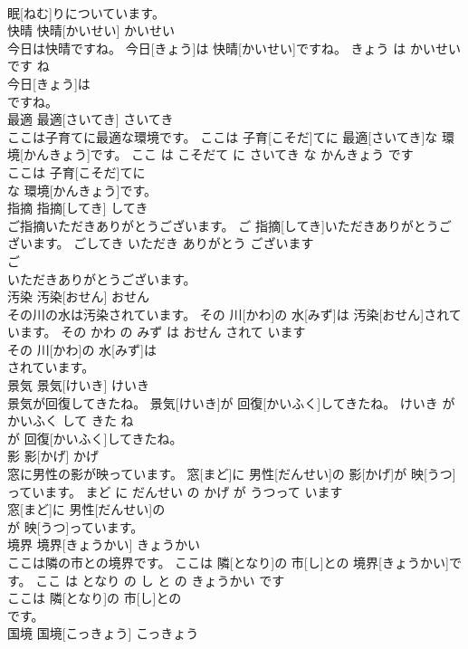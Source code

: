 \documentclass[8pt]{extreport}
\begin{document}
\begin{CJK}{UTF8}{min}
\\	眠[ねむ]りについています。			
\\	快晴	快晴[かいせい]	かいせい	
\\	今日は快晴ですね。	今日[きょう]は 快晴[かいせい]ですね。	きょう は かいせい です ね	
\\	今日[きょう]は
\\	ですね。			
\\	最適	最適[さいてき]	さいてき	
\\	ここは子育てに最適な環境です。	ここは 子育[こそだ]てに 最適[さいてき]な 環境[かんきょう]です。	ここ は こそだて に さいてき な かんきょう です	
\\	ここは 子育[こそだ]てに
\\	な 環境[かんきょう]です。			
\\	指摘	指摘[してき]	してき	
\\	ご指摘いただきありがとうございます。	ご 指摘[してき]いただきありがとうございます。	ごしてき いただき ありがとう ございます	
\\	ご
\\	いただきありがとうございます。			
\\	汚染	汚染[おせん]	おせん	
\\	その川の水は汚染されています。	その 川[かわ]の 水[みず]は 汚染[おせん]されています。	その かわ の みず は おせん されて います	
\\	その 川[かわ]の 水[みず]は
\\	されています。			
\\	景気	景気[けいき]	けいき	
\\	景気が回復してきたね。	景気[けいき]が 回復[かいふく]してきたね。	けいき が かいふく して きた ね	
\\	が 回復[かいふく]してきたね。			
\\	影	影[かげ]	かげ	
\\	窓に男性の影が映っています。	窓[まど]に 男性[だんせい]の 影[かげ]が 映[うつ]っています。	まど に だんせい の かげ が うつって います	
\\	窓[まど]に 男性[だんせい]の
\\	が 映[うつ]っています。			
\\	境界	境界[きょうかい]	きょうかい	
\\	ここは隣の市との境界です。	ここは 隣[となり]の 市[し]との 境界[きょうかい]です。	ここ は となり の し と の きょうかい です	
\\	ここは 隣[となり]の 市[し]との
\\	です。			
\\	国境	国境[こっきょう]	こっきょう	

\end{CJK}
\end{document}

